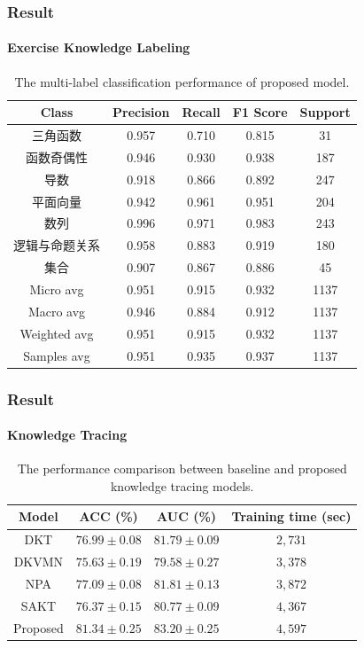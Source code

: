 \documentclass{beamer}
\begin{document}
\begin{frame}
  \frametitle{Result}
  \framesubtitle{Exercise Knowledge Labeling}
  \begin{table}[htbp!]
    \caption{The multi-label classification performance of proposed model.}\label{tbl:ch2-result-detail}
    \centering
    \begin{tabular}{ccccc}
      \toprule
      Class          & Precision & Recall & F1 Score & Support \\
      \midrule
      三角函数       & 0.957     & 0.710  & 0.815    & 31      \\
      函数奇偶性     & 0.946     & 0.930  & 0.938    & 187     \\
      导数           & 0.918     & 0.866  & 0.892    & 247     \\
      平面向量       & 0.942     & 0.961  & 0.951    & 204     \\
      数列           & 0.996     & 0.971  & 0.983    & 243     \\
      逻辑与命题关系 & 0.958     & 0.883  & 0.919    & 180     \\
      集合           & 0.907     & 0.867  & 0.886    & 45      \\
      \midrule
      Micro avg      & 0.951     & 0.915  & 0.932    & 1137    \\
      Macro avg      & 0.946     & 0.884  & 0.912    & 1137    \\
      Weighted avg   & 0.951     & 0.915  & 0.932    & 1137    \\
      Samples avg    & 0.951     & 0.935  & 0.937    & 1137    \\
      \bottomrule
    \end{tabular}
  \end{table}
\end{frame}


\begin{frame}
  \frametitle{Result}
  \framesubtitle{Knowledge Tracing}
  \begin{table}[htb]
    \centering
    \caption{The performance comparison between baseline and proposed knowledge tracing models.}\label{tbl:ch3-performance}
    \begin{tabular}{cccc}
      \toprule
      Model    & ACC (\%)                    & AUC (\%)                   & Training time (sec) \\
      \midrule
      DKT      & \(76.99\pm 0.08 \)          & \(81.79\pm 0.09\)          & \(2,731\)           \\
      DKVMN    & \(75.63\pm 0.19 \)          & \(79.58\pm 0.27\)          & \(3,378\)           \\
      NPA      & \(77.09\pm 0.08\)           & \(81.81\pm 0.13\)          & \(3,872\)           \\
      SAKT     & \(76.37\pm 0.15\)           & \(80.77\pm 0.09\)          & \(4,367\)           \\
      \midrule
      Proposed & \(\mathbf{81.34\pm 0.25} \) & \(\mathbf{83.20\pm 0.25}\) & \(4,597\)           \\
      \bottomrule
    \end{tabular}
  \end{table}
\end{frame}
\end{document}
